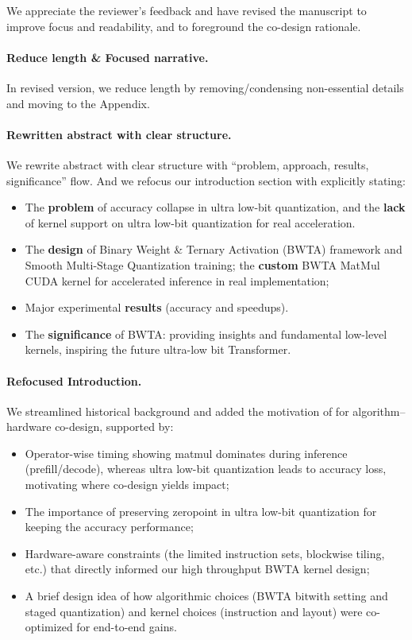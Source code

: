 \begin{revresponse}[]
We appreciate the reviewer's feedback and have revised the manuscript to improve focus and readability, and to foreground the co-design rationale.

\paragraph{Reduce length \& Focused narrative.} In revised version, we reduce length by removing/condensing non-essential details and moving  to the Appendix.

\paragraph{Rewritten abstract with clear structure. } We rewrite abstract with clear structure with ``problem, approach, results, significance'' flow. And we refocus our introduction section with explicitly stating: 
\begin{itemize}
    \item The \textbf{problem} of accuracy collapse in ultra low-bit quantization, and the \textbf{lack} of kernel support on ultra low-bit quantization for real acceleration. 
    \item The \textbf{design} of Binary Weight \& Ternary Activation (BWTA) framework and Smooth Multi-Stage Quantization training; the \textbf{custom} BWTA MatMul CUDA kernel for accelerated inference in real implementation;
    \item Major experimental \textbf{results} (accuracy and speedups). 
    \item The \textbf{significance} of BWTA: providing insights and fundamental low-level kernels, inspiring the future ultra-low bit Transformer. 
\end{itemize}

\paragraph{Refocused Introduction.} 
We streamlined historical background and added the motivation of for algorithm–hardware co-design, supported by: 
\begin{itemize}
    \item Operator-wise timing showing matmul dominates during inference (prefill/decode), whereas ultra low-bit quantization leads to accuracy loss, motivating where co-design yields impact; 
    \item The importance of preserving zeropoint in ultra low-bit quantization for keeping the accuracy performance; 
    \item Hardware-aware constraints (the limited instruction sets, blockwise tiling, etc.) that directly informed our high throughput BWTA kernel design; 
    \item A brief design idea of how algorithmic choices (BWTA bitwith setting and staged quantization) and kernel choices (instruction and layout) were co-optimized for end-to-end gains. 
\end{itemize}


\end{revresponse}
